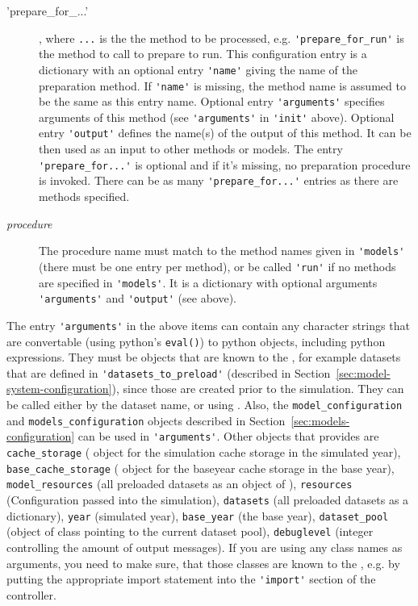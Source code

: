\begin{description}
\item['prepare_for_...'], where \verb|...| is the the method
to be processed, e.g. \verb|'prepare_for_run'| is the method to call to prepare
to run. This configuration entry is a dictionary with an
optional entry \verb|'name'| giving the name of the preparation method. If \verb|'name'| is
missing, the method name is assumed to be the same as this entry name. Optional
entry \verb|'arguments'| specifies arguments of this method (see \verb|'arguments'| in \verb|'init'|
above). Optional entry \verb|'output'| defines the name(s) of the output of this
method.  It can be then used as an input to other methods or models. The entry
\verb|'prepare_for...'| is optional and if it's missing, no preparation procedure is
invoked. There can be as many \verb|'prepare_for...'| entries as there are
methods specified.
\item[{\it procedure}] The procedure name must match to the method names given
in \verb|'models'| (there must be one entry per method), or be called \verb|'run'| if no
methods are specified in \verb|'models'|. It is a dictionary with optional arguments
\verb|'arguments'| and \verb|'output'| (see above).
\end{description}

The entry \verb|'arguments'| in the above items can contain any character
strings that are convertable (using python's \verb|eval()|) to python \pythonindex objects,
including python \pythonindex expressions. They must be objects that are known to the
, for example datasets \datasetindex that are defined in
\verb|'datasets_to_preload'| (described in
Section~\ref{sec:model-system-configuration}), since those are created prior to
the simulation. They can be called either by the dataset \datasetindex name, or using
. Also, the \verb|model_configuration| and
\verb|models_configuration| objects described in
Section~\ref{sec:models-configuration} can be used in \verb|'arguments'|. Other
objects that  provides are  \verb|cache_storage|
( object for the simulation cache \simulationcacheindex storage
in the simulated year), \verb|base_cache_storage| \baseyearcacheindex ( object for
the baseyear cache \baseyearcacheindex storage in the base year),
\verb|model_resources| (all preloaded datasets as an object of
),  \verb|resources|
(Configuration passed into the simulation), \verb|datasets| (all preloaded datasets as a dictionary),
\verb|year| (simulated year), \verb|base_year| (the base year),
\verb|dataset_pool| (object of class  pointing to the current
dataset pool), \verb|debuglevel| (integer controlling the amount of output messages).  
If you are using any class names
as arguments, you need to make sure, that those classes are known to the
, e.g. by putting the appropriate import statement into the
\verb|'import'| section of the controller.

